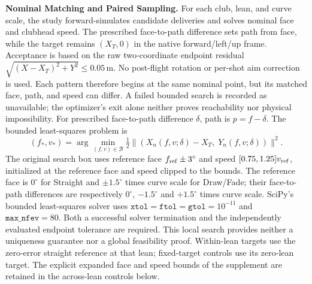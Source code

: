 \documentclass[11pt,letterpaper]{article}
\begin{document}
\begin{center}
\setlength{\fboxsep}{7pt}
\end{center}

\textbf{Nominal Matching and Paired Sampling.} For each club, lean, and curve
scale, the study forward-simulates candidate deliveries and solves nominal
face and clubhead speed. The prescribed face-to-path difference sets path from
face, while the target remains $(X_T,0)$ in the native forward/left/up frame.
Acceptance is based on the raw two-coordinate endpoint residual
$\sqrt{(X-X_T)^2+Y^2}\leq0.05$\,m. No post-flight rotation or per-shot aim
correction is used. Each pattern therefore begins at the same nominal point,
but its matched face, path, and speed can differ. A failed bounded search is
recorded as unavailable; the optimizer's exit alone neither proves
reachability nor physical impossibility.
For prescribed face-to-path difference $\delta$, path is $p=f-\delta$.
The bounded least-squares problem is
\[
 (f_*,v_*)=\arg\min_{(f,v)\in\mathcal B}
 \tfrac12\|(X_n(f,v;\delta)-X_T,\;Y_n(f,v;\delta))\|^2.
\]
The original search box uses reference face $f_{\rm ref}\pm3^\circ$ and
speed $[0.75,1.25]v_{\rm ref}$, initialized at the reference face and speed
clipped to the bounds. The reference face is $0^\circ$ for Straight and
$\pm1.5^\circ$ times curve scale for Draw/Fade; their face-to-path
differences are respectively $0^\circ$, $-1.5^\circ$ and $+1.5^\circ$
times curve scale. SciPy's bounded least-squares solver uses
$\texttt{xtol}=\texttt{ftol}=\texttt{gtol}=10^{-11}$ and
$\texttt{max\_nfev}=80$. Both a successful solver termination and the
independently evaluated endpoint tolerance are required. This local search
provides neither a uniqueness guarantee nor a global feasibility proof.
Within-lean targets use the zero-error straight reference at that lean;
fixed-target controls use its zero-lean target. The explicit expanded face and
speed bounds of the supplement are retained in the across-lean controls below.
\end{document}
